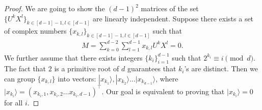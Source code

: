 \documentclass[11pt,letterpaper]{article}
\newcommand{\ket}[1]{|#1\rangle}
\newcommand{\1}{\mathbb{1}}
\theoremstyle{definition}
\begin{document}
\begin{proof}
We are going to show the $(d-1)^2$ matrices of the set $\{U^k X^l\}_{k \in[d-1]-1, l \in [d-1]}$ are linearly independent.
Suppose there exists a set of complex numbers $\{ x_{k,l} \}_{k \in[d-1]-1, l \in [d-1]}$
such that 
\begin{align}
	M = \sum_{k=0}^{d-2} \sum_{l=1}^{d-1} x_{k,l} U^k X^l = 0. 
\end{align}
We further assume that there exists integers $\{ k_i \}_{i=1}^{d-1}$ such that $2^{k_i} \equiv i \pmod{d}$.
The fact that $2$ is a primitive root of $d$ guarantees that $k_i$'s are distinct.
Then we can group $\{x_{k,l}\}$ into vectors: $\ket{x_{k_1}}, \ket{x_{k_2}} \dots \ket{x_{k_{d-1}}}$,
where $\ket{x_{k_i}}= (x_{k_i, 1}, x_{k_i, 2} \dots x_{k_i, d-1})^\intercal$.
Our goal is equivalent to proving that $\ket{x_{k_i}} = 0$ for all $i$.


\end{proof}
\end{document}
